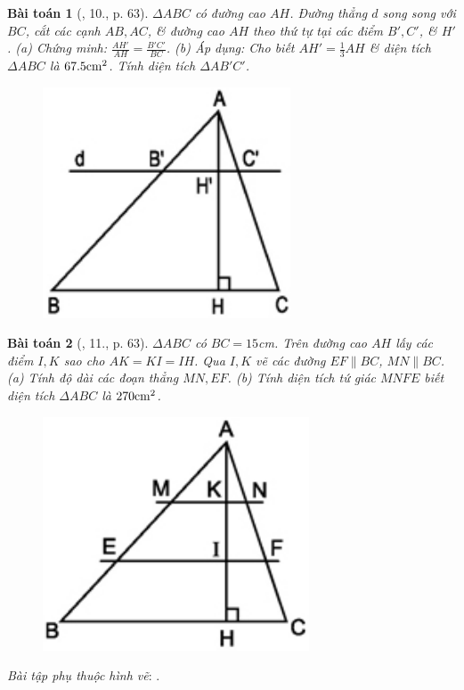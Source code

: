 \documentclass{article}
\newtheorem{baitoan}{Bài toán}
\begin{document}
\begin{baitoan}[\cite{SGK_Toan_8_tap_2}, 10., p. 63]
	$\Delta ABC$ có đường cao $AH$. Đường thẳng $d$ song song với $BC$, cắt các cạnh $AB,AC$, \& đường cao $AH$ theo thứ tự tại các điểm $B',C'$, \& $H'$. (a) Chứng minh: $\frac{AH'}{AH} = \frac{B'C'}{BC}$. (b) Áp dụng: Cho biết $AH' = \frac{1}{3}AH$ \& diện tích $\Delta ABC$ là $67.5{\rm cm}^2$. Tính diện tích $\Delta AB'C'$.
	\begin{figure}[H]
		\centering
		\includegraphics[scale=.25]{SGK_Toan_8_16}
	\end{figure}
\end{baitoan}

\begin{baitoan}[\cite{SGK_Toan_8_tap_2}, 11., p. 63]
	$\Delta ABC$ có $BC = 15$\emph{cm}. Trên đường cao $AH$ lấy các điểm $I,K$ sao cho $AK = KI = IH$. Qua $I,K$ vẽ các đường $EF\parallel BC$, $MN\parallel BC$. (a) Tính độ dài các đoạn thẳng $MN,EF$. (b) Tính diện tích tứ giác $MNFE$ biết diện tích $\Delta ABC$ là $270{\rm cm}^2$.
	\begin{figure}[H]
		\centering
		\includegraphics[scale=.25]{SGK_Toan_8_17}
	\end{figure}
\end{baitoan}
\noindent\textit{Bài tập phụ thuộc hình vẽ}: \cite[12.--13., p. 64]{SGK_Toan_8_tap_2}.
\end{document}
